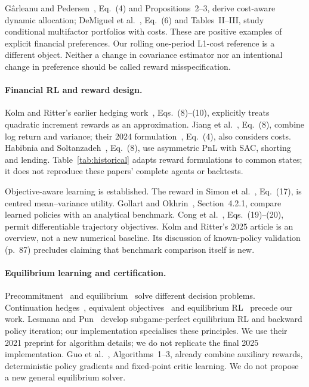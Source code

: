\documentclass[sigconf,anonymous,review]{acmart}
\begin{document}
G\^arleanu and Pedersen~\cite{garleanu2013}, Eq.~(4) and Propositions~2--3, derive cost-aware dynamic allocation; DeMiguel et al.~\cite{demiguel2024}, Eq.~(6) and Tables~II--III, study conditional multifactor portfolios with costs. These are positive examples of explicit financial preferences. Our rolling one-period L1-cost reference is a different object. Neither a change in covariance estimator nor an intentional change in preference should be called reward misspecification.

\paragraph{Financial RL and reward design.}
Kolm and Ritter's earlier hedging work~\cite{kolm2019}, Eqs.~(8)--(10), explicitly treats quadratic increment rewards as an approximation. Jiang et al.~\cite{jiang2025}, Eq.~(8), combine log return and variance; their 2024 formulation~\cite{jiang2024}, Eq.~(4), also considers costs. Habibnia and Soltanzadeh~\cite{habibnia2024}, Eq.~(8), use asymmetric PnL with SAC, shorting and lending. Table~\ref{tab:historical} adapts reward formulations to common states; it does not reproduce these papers' complete agents or backtests.

Objective-aware learning is established. The reward in Simon et al.~\cite{simon2026}, Eq.~(17), is centred mean--variance utility. Gollart and Okhrin~\cite{gollart2025}, Section~4.2.1, compare learned policies with an analytical benchmark. Cong et al.~\cite{cong2026}, Eqs.~(19)--(20), permit differentiable trajectory objectives. Kolm and Ritter's 2025 article is an overview, not a new numerical baseline. Its discussion of known-policy validation (p.~87) precludes claiming that benchmark comparison itself is new.

\paragraph{Equilibrium learning and certification.}
Precommitment~\cite{ling2000} and equilibrium~\cite{basak2010} solve different decision problems. Continuation hedges~\cite{czichowsky2013}, equivalent objectives~\cite{bkm2016} and equilibrium RL~\cite{dai2023} precede our work. Lesmana and Pun~\cite{lesmana2025} develop subgame-perfect equilibrium RL and backward policy iteration; our implementation specialises these principles. We use their 2021 preprint for algorithm details; we do not replicate the final 2025 implementation. Guo et al.~\cite{guo2026}, Algorithms~1--3, already combine auxiliary rewards, deterministic policy gradients and fixed-point critic learning. We do not propose a new general equilibrium solver.
\end{document}
